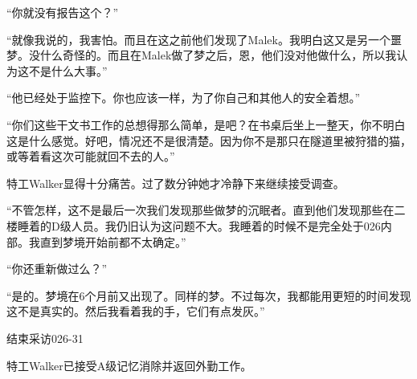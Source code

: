 “你就没有报告这个？”

“就像我说的，我害怕。而且在这之前他们发现了Malek。我明白这又是另一个噩梦。没什么奇怪的。而且在Malek做了梦之后，恩，他们没对他做什么，所以我认为这不是什么大事。”

“他已经处于监控下。你也应该一样，为了你自己和其他人的安全着想。”

“你们这些干文书工作的总想得那么简单，是吧？在书桌后坐上一整天，你不明白这是什么感觉。好吧，情况还不是很清楚。因为你不是那只在隧道里被狩猎的猫，或等着看这次可能就回不去的人。”

特工Walker显得十分痛苦。过了数分钟她才冷静下来继续接受调查。

“不管怎样，这不是最后一次我们发现那些做梦的沉眠者。直到他们发现那些在二楼睡着的D级人员。我仍旧认为这问题不大。我睡着的时候不是完全处于026内部。我直到梦境开始前都不太确定。”

“你还重新做过么？”

“是的。梦境在6个月前又出现了。同样的梦。不过每次，我都能用更短的时间发现这不是真实的。然后我看着我的手，它们有点发灰。”

结束采访026-31

特工Walker已接受A级记忆消除并返回外勤工作。
